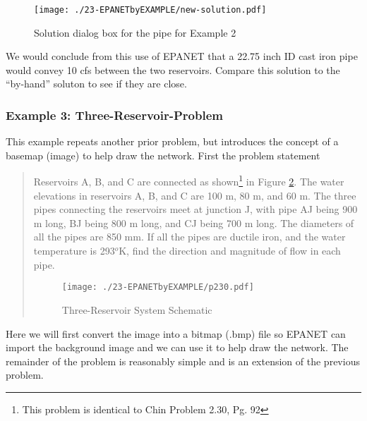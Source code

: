 \begin{figure}[htbp] %
   \centering
   \texttt{[image: ./23-EPANETbyEXAMPLE/new-solution.pdf]} 
   \caption{Solution dialog box for the pipe for Example 2}
   \label{fig:new-solution}
\end{figure}

We would conclude from this use of EPANET that a 22.75 inch ID cast iron pipe would convey 10 cfs between the two reservoirs.  Compare this solution to the ``by-hand'' soluton to see if they are close.
\clearpage
\subsubsection{Example 3: Three-Reservoir-Problem}
This example repeats another prior problem, but introduces the concept of a basemap (image) to help draw the network.  First the problem statement

\begin{quote}
Reservoirs A, B, and C are connected as shown\footnote{This problem is identical to Chin Problem 2.30, Pg. 92} in Figure \ref{fig:p230}.  The water elevations in reservoirs A, B, and C are 100 m, 80 m, and 60 m.   The three pipes connecting the reservoirs meet at junction J, with pipe AJ being 900 m long, BJ being 800 m long, and CJ being 700 m long.  The diameters of all the pipes are
850 mm.  If all the pipes are ductile iron, and the water temperature is 293$^o$K, find the direction and magnitude of flow in each pipe.

\begin{figure}[htbp] %
   \centering
   \texttt{[image: ./23-EPANETbyEXAMPLE/p230.pdf]} 
   \caption{Three-Reservoir System Schematic}
   \label{fig:p230}
\end{figure}
\end{quote}

Here we will first convert the image into a bitmap (.bmp) file so EPANET can import the background image and we can use it to help draw the network.  The remainder of the problem is reasonably simple and is an extension of the previous problem.

